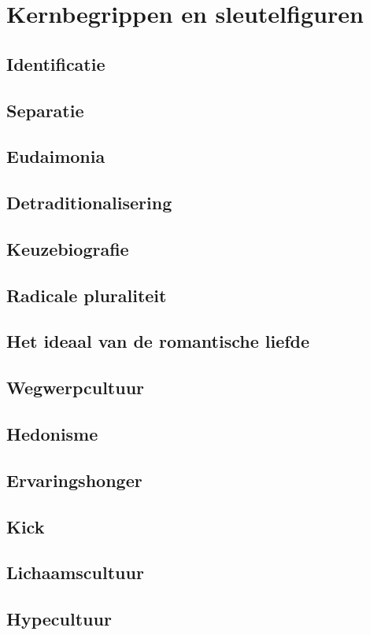 \documentclass[main.tex]{subfiles}
\begin{document}
\section{Kernbegrippen en sleutelfiguren}

\subsection*{Identificatie}
\subsection*{Separatie}
\subsection*{Eudaimonia}
\subsection*{Detraditionalisering}
\subsection*{Keuzebiografie}
\subsection*{Radicale pluraliteit}
\subsection*{Het ideaal van de romantische liefde}
\subsection*{Wegwerpcultuur}
\subsection*{Hedonisme}
\subsection*{Ervaringshonger}
\subsection*{Kick}
\subsection*{Lichaamscultuur}
\subsection*{Hypecultuur}
\end{document}
